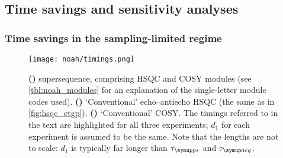 \subsection{Time savings and sensitivity analyses}
\label{subsec:noah__snr}


\subsubsection{Time savings in the sampling-limited regime}

\begin{figure}[htb]
    \centering
    \texttt{[image: noah/timings.png]}%
    {\label{fig:noah_timings_noah_sc}}%
    {\label{fig:noah_timings_conv_s}}%
    {\label{fig:noah_timings_conv_c}}%
    \caption[Comparison of NOAH and conventional 2D experiments]{
        \textbf{()}  supersequence, comprising HSQC and COSY modules (see \cref{tbl:noah_modules} for an explanation of the single-letter module codes used).
        \textbf{()} `Conventional' echo--antiecho HSQC (the same as in \cref{fig:hsqc_etgp}).
        \textbf{()} `Conventional' COSY.
        The timings referred to in the text are highlighted for all three experiments; $d_1$ for each experiment is assumed to be the same.
        Note that the lengths are not to scale: $d_1$ is typically far longer than $\taups$ and $\tauacq$.
    }
    \label{fig:noah_timings}
\end{figure}


